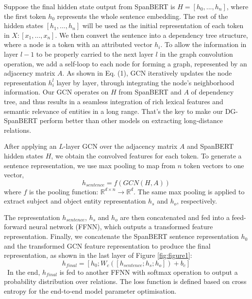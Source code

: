 \documentclass{article}
\begin{document}
Suppose the final hidden state output from SpanBERT is $H = [h_0,...,h_n]$, where the first token $h_0$ represents the whole sentence embedding. The rest of the hidden states $[h_1,...,h_n]$ will be used as the initial representation of  each token in $X:[x_1,...,x_n]$. We then convert the sentence into a dependency tree structure, where a node is a token with an attributed vector $h_i$. To allow the information in layer ${l-1}$ to be properly carried to the next layer ${l}$ in the graph convolution operation, we add a self-loop to each node for forming a graph, represented by  an adjacency matrix $A$. As shown in Eq. (1), GCN iteratively updates the node representation $h_i^l$ layer by layer, through integrating the node's neighborhood information. Our GCN operates on  $H$ from SpanBERT and $A$ of dependency tree, and thus results in a seamless integration of rich lexical features and semantic relevance of entities in a long range. That's the key to make our DG-SpanBERT perform better than other models on extracting long-distance relations.

After applying an $L$-layer GCN over the adjacency matrix $A$ and SpanBERT hidden states $H$, we obtain the convolved features for each token. To generate a sentence representation, we use  max pooling  to map from $n$ token vectors to one vector, \begin{equation} h_{sentence} = f(GCN(H,A))
\end{equation}
where $f$ is the pooling function: $\mathbb{R}^{d \times n} \rightarrow \mathbb{R}^{d}$. The same max pooling is applied to extract subject and object entity representation $h_s$ and $h_o$, respectively.






The representation $h_{sentence}$, $h_{s}$ and $h_{o}$
are then concatenated  and fed into a feed-forward neural network (FFNN), which outputs a transformed feature representation. Finally, we concatenate the SpanBERT sentence representation $h_0$ and the transformed GCN feature representation to produce the final representation, as shown in the last layer of Figure \ref{fig:figure1}:
\begin{equation} h_{final} = [h_{0}; W_{c}([h_{sentence}; h_{s}; h_{o}])+b_c]
\end{equation}
\
In the end,  $h_{final}$ is fed to another FFNN with softmax operation to output a probability distribution over relations.
The loss function is defined based on cross entropy for the end-to-end model parameter optimisation. 
\
\end{document}
